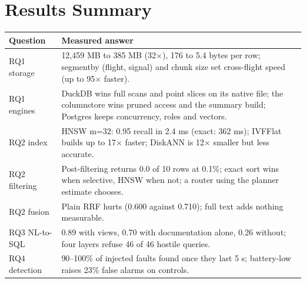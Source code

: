 \documentclass[11pt,a4paper]{article}
\begin{document}
\section{Results Summary}
\begin{table}[H]
\centering
\small
\begin{tabular}{p{4.5cm}p{8.5cm}}
\toprule
Question & Measured answer\\
\midrule
RQ1 storage & 12,459 MB to 385 MB (32$\times$), 176 to 5.4 bytes per row; segmentby (flight, signal) and chunk size set cross-flight speed (up to 95$\times$ faster).\\
RQ1 engines & DuckDB wins full scans and point slices on its native file; the columnstore wins pruned access and the summary build; Postgres keeps concurrency, roles and vectors.\\
RQ2 index & HNSW m=32: 0.95 recall in 2.4 ms (exact: 362 ms); IVFFlat builds up to 17$\times$ faster; DiskANN is 12$\times$ smaller but less accurate.\\
RQ2 filtering & Post-filtering returns 0.0 of 10 rows at 0.1\%; exact sort wins when selective, HNSW when not; a router using the planner estimate chooses.\\
RQ2 fusion & Plain RRF hurts (0.600 against 0.710); full text adds nothing measurable.\\
RQ3 NL-to-SQL & 0.89 with views, 0.70 with documentation alone, 0.26 without; four layers refuse 46 of 46 hostile queries.\\
RQ4 detection & 90--100\% of injected faults found once they last 5 s; battery-low raises 23\% false alarms on controls.\\
\bottomrule
\end{tabular}
\end{table}

\end{document}

